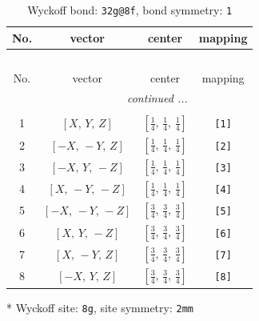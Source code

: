 \documentclass[fleqn,8pt]{jsarticle}
\begin{document}
\renewcommand{\arraystretch}{1.2}
\begin{longtable}{cccc}
\caption{Wyckoff bond: {\tt 32g@8f}, bond symmetry: {\tt 1}}
 \\
 \hline \hline
No. & vector & center & mapping \\ \hline \endfirsthead

\multicolumn{3}{l}{\tablename\ \thetable{}} \\
 \hline \hline
No. & vector & center & mapping \\ \hline \endhead

 \hline \hline
\multicolumn{3}{r}{\footnotesize\it continued ...} \\ \endfoot

 \hline \hline
\multicolumn{3}{r}{} \\ \endlastfoot

1 & $\left[ X,\, Y,\, Z \right]$ & $\left[ \frac{1}{4},\, \frac{1}{4},\, \frac{1}{4} \right]$ & {\tt [1]} \\ \hline
2 & $\left[ - X,\, - Y,\, Z \right]$ & $\left[ \frac{1}{4},\, \frac{1}{4},\, \frac{1}{4} \right]$ & {\tt [2]} \\ \hline
3 & $\left[ - X,\, Y,\, - Z \right]$ & $\left[ \frac{1}{4},\, \frac{1}{4},\, \frac{1}{4} \right]$ & {\tt [3]} \\ \hline
4 & $\left[ X,\, - Y,\, - Z \right]$ & $\left[ \frac{1}{4},\, \frac{1}{4},\, \frac{1}{4} \right]$ & {\tt [4]} \\ \hline
5 & $\left[ - X,\, - Y,\, - Z \right]$ & $\left[ \frac{3}{4},\, \frac{3}{4},\, \frac{3}{4} \right]$ & {\tt [5]} \\ \hline
6 & $\left[ X,\, Y,\, - Z \right]$ & $\left[ \frac{3}{4},\, \frac{3}{4},\, \frac{3}{4} \right]$ & {\tt [6]} \\ \hline
7 & $\left[ X,\, - Y,\, Z \right]$ & $\left[ \frac{3}{4},\, \frac{3}{4},\, \frac{3}{4} \right]$ & {\tt [7]} \\ \hline
8 & $\left[ - X,\, Y,\, Z \right]$ & $\left[ \frac{3}{4},\, \frac{3}{4},\, \frac{3}{4} \right]$ & {\tt [8]} \\
\end{longtable}
* Wyckoff site: {\tt 8g}, site symmetry: {\tt 2mm}
\renewcommand{\arraystretch}{1.2}
\end{document}
